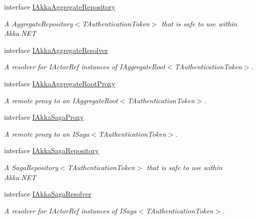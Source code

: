 \begin{DoxyCompactItemize}
interface \hyperlink{interfaceCqrs_1_1Akka_1_1Domain_1_1IAkkaAggregateRepository}{I\+Akka\+Aggregate\+Repository}
\begin{DoxyCompactList}\small\item\em A Aggregate\+Repository$<$\+T\+Authentication\+Token$>$ that is safe to use within Akka.\+N\+ET \end{DoxyCompactList}\item 
interface \hyperlink{interfaceCqrs_1_1Akka_1_1Domain_1_1IAkkaAggregateResolver}{I\+Akka\+Aggregate\+Resolver}
\begin{DoxyCompactList}\small\item\em A resolver for I\+Actor\+Ref instances of I\+Aggregate\+Root$<$\+T\+Authentication\+Token$>$. \end{DoxyCompactList}\item 
interface \hyperlink{interfaceCqrs_1_1Akka_1_1Domain_1_1IAkkaAggregateRootProxy}{I\+Akka\+Aggregate\+Root\+Proxy}
\begin{DoxyCompactList}\small\item\em A remote proxy to an I\+Aggregate\+Root$<$\+T\+Authentication\+Token$>$. \end{DoxyCompactList}\item 
interface \hyperlink{interfaceCqrs_1_1Akka_1_1Domain_1_1IAkkaSagaProxy}{I\+Akka\+Saga\+Proxy}
\begin{DoxyCompactList}\small\item\em A remote proxy to an I\+Saga$<$\+T\+Authentication\+Token$>$. \end{DoxyCompactList}\item 
interface \hyperlink{interfaceCqrs_1_1Akka_1_1Domain_1_1IAkkaSagaRepository}{I\+Akka\+Saga\+Repository}
\begin{DoxyCompactList}\small\item\em A Saga\+Repository$<$\+T\+Authentication\+Token$>$ that is safe to use within Akka.\+N\+ET \end{DoxyCompactList}\item 
interface \hyperlink{interfaceCqrs_1_1Akka_1_1Domain_1_1IAkkaSagaResolver}{I\+Akka\+Saga\+Resolver}
\begin{DoxyCompactList}\small\item\em A resolver for I\+Actor\+Ref instances of I\+Saga$<$\+T\+Authentication\+Token$>$. \end{DoxyCompactList}\end{DoxyCompactItemize}
